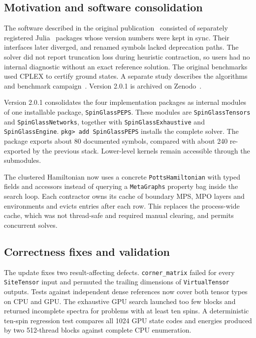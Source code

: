 \documentclass[preprint,12pt,a4paper]{elsarticle}
\begin{document}
\subsection{Motivation and software consolidation}

The software described in the original publication~\cite{smierzchalski2025spinglasspeps}
consisted of separately registered Julia~\cite{bezanson2017julia} packages whose
version numbers were kept in sync. Their interfaces later diverged, and renamed
symbols lacked deprecation paths. The solver did not report truncation loss
during heuristic contraction, so users had no internal diagnostic without an
exact reference solution. The original benchmarks used CPLEX to certify ground
states. A separate study describes the algorithms and benchmark
campaign~\cite{dziubyna2025limitations}. Version 2.0.1 is archived on
Zenodo~\cite{spinglasspeps_zenodo}.

Version 2.0.1 consolidates the four implementation packages as internal modules
of one installable package, \texttt{SpinGlassPEPS}. These modules are
\texttt{SpinGlassTensors} and \texttt{SpinGlassNetworks}, together with
\texttt{SpinGlassExhaustive} and \texttt{SpinGlassEngine}.
\texttt{pkg> add SpinGlassPEPS} installs the complete solver.
The package exports about 80 documented symbols, compared with about 240
re-exported by the previous stack.
Lower-level kernels remain accessible through the submodules.

The clustered Hamiltonian now uses a concrete \texttt{PottsHamiltonian} with
typed fields and accessors instead of querying a \texttt{MetaGraphs} property bag
inside the search loop. Each contractor owns its cache of boundary MPS, MPO
layers and environments and evicts entries after each row. This replaces the
process-wide cache, which was not thread-safe and required manual clearing, and
permits concurrent solves.

\subsection{Correctness fixes and validation}

The update fixes two result-affecting defects. \texttt{corner\_matrix} failed
for every \texttt{SiteTensor} input and permuted the trailing dimensions of
\texttt{VirtualTensor} outputs. Tests against independent dense references now
cover both tensor types on CPU and GPU. The exhaustive GPU search launched too few
blocks and returned incomplete spectra for problems with at least ten spins. A
deterministic ten-spin regression test compares all 1024 GPU state codes and
energies produced by two 512-thread blocks against complete CPU enumeration.
\end{document}
